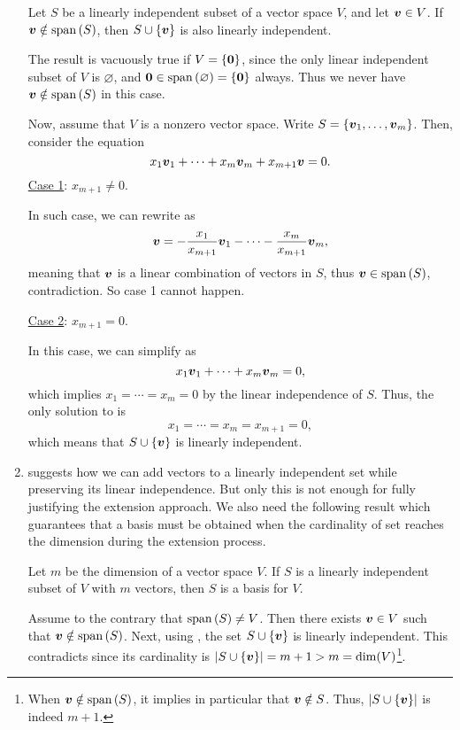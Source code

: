 \begin{enumerate}
\begin{theorem}
\label{thm:add-vec-not-in-spn}
Let \(S\) be a linearly independent subset of a vector space \(V\), and let
\(\vb*{v}\in V\). If \(\vb*{v}\notin\operatorname{span}\qty(S)\), then \(S\cup\{\vb*{v}\}\) is
also linearly independent.
\end{theorem}
\begin{pf}
The result is vacuously true if \(V=\{\vb*{0}\}\), since the only linear
independent subset of \(V\) is \(\varnothing\), and
\(\vb*{0}\in\operatorname{span}\qty(\varnothing)=\{\vb*{0}\}\) always. Thus we never have
\(\vb*{v}\notin\operatorname{span}\qty(S)\) in this case.

Now, assume that \(V\) is a nonzero vector space. Write
\(S=\{\vb*{v}_1,\dotsc,\vb*{v}_m\}\). Then, consider the equation
\begin{equation}
\label{eq:extend-li}
x_1\vb*{v}_1+\dotsb+x_m\vb*{v}_m+x_{m+1}\vb*{v}=0.
\end{equation}
\underline{Case 1}: \(x_{m+1}\ne 0\).

In such case, we can rewrite  as
\[
\vb*{v}=-\frac{x_1}{x_{m+1}}\vb*{v}_1-\dotsb-\frac{x_m}{x_{m+1}}\vb*{v}_m,
\]
meaning that \(\vb*{v}\) is a linear combination of vectors in \(S\), thus
\(\vb*{v}\in\operatorname{span}\qty(S)\), contradiction. So case 1 cannot happen.

\underline{Case 2}: \(x_{m+1}=0\).

In this case, we can simplify  as
\[
x_1\vb*{v}_1+\dotsb+x_m\vb*{v}_m=0,
\]
which implies \(x_1=\dotsb=x_m=0\) by the linear independence of \(S\).
Thus, the only solution to  is
\[
x_1=\dotsb=x_m=x_{m+1}=0,
\]
which means that \(S\cup\{\vb*{v}\}\) is linearly independent.
\end{pf}
\item {} suggests how we can add vectors to a
linearly independent set while preserving its linear independence. But only
this is not enough for fully justifying the extension approach. We also need
the following result which guarantees that a basis must be obtained when the
cardinality of set reaches the dimension during the extension process.

\begin{theorem}
\label{thm:card-dim-li-basis}
Let \(m\) be the dimension of a vector space \(V\). If \(S\) is a linearly
independent subset of \(V\) with \(m\) vectors, then \(S\) is a basis for
\(V\).
\end{theorem}
\begin{pf}
Assume to the contrary that \(\operatorname{span}\qty(S)\ne V\). Then there exists \(\vb*{v}\in
V\) such that \(\vb*{v}\notin\operatorname{span}\qty(S)\). Next, using
, the set \(S\cup\{\vb*{v}\}\) is linearly
independent. This contradicts  since its cardinality is
\(|S\cup\{\vb*{v}\}|=m+1>m=\dim(V)\)\footnote{When \(\vb*{v}\notin\operatorname{span}\qty(S)\), it
implies in particular that \(\vb*{v}\notin S\). Thus, \(|S\cup\{\vb*{v}\}|\)
is indeed \(m+1\).}.
\end{pf}


\end{enumerate}

